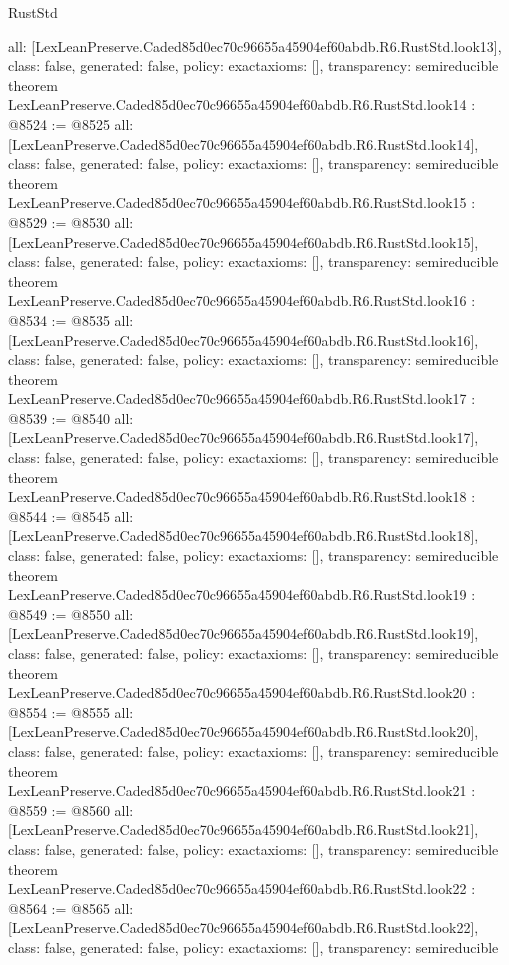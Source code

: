 \begin{lexlean}{RustStd}
\begin{coremodule}
{  all: [LexLeanPreserve.Caded85d0ec70c96655a45904ef60abdb.R6.RustStd.look13],
  class: false,
  generated: false,
  policy: exact{axioms: []},
  transparency: semireducible
}
theorem LexLeanPreserve.Caded85d0ec70c96655a45904ef60abdb.R6.RustStd.look14 : @8524 := @8525 {
  all: [LexLeanPreserve.Caded85d0ec70c96655a45904ef60abdb.R6.RustStd.look14],
  class: false,
  generated: false,
  policy: exact{axioms: []},
  transparency: semireducible
}
theorem LexLeanPreserve.Caded85d0ec70c96655a45904ef60abdb.R6.RustStd.look15 : @8529 := @8530 {
  all: [LexLeanPreserve.Caded85d0ec70c96655a45904ef60abdb.R6.RustStd.look15],
  class: false,
  generated: false,
  policy: exact{axioms: []},
  transparency: semireducible
}
theorem LexLeanPreserve.Caded85d0ec70c96655a45904ef60abdb.R6.RustStd.look16 : @8534 := @8535 {
  all: [LexLeanPreserve.Caded85d0ec70c96655a45904ef60abdb.R6.RustStd.look16],
  class: false,
  generated: false,
  policy: exact{axioms: []},
  transparency: semireducible
}
theorem LexLeanPreserve.Caded85d0ec70c96655a45904ef60abdb.R6.RustStd.look17 : @8539 := @8540 {
  all: [LexLeanPreserve.Caded85d0ec70c96655a45904ef60abdb.R6.RustStd.look17],
  class: false,
  generated: false,
  policy: exact{axioms: []},
  transparency: semireducible
}
theorem LexLeanPreserve.Caded85d0ec70c96655a45904ef60abdb.R6.RustStd.look18 : @8544 := @8545 {
  all: [LexLeanPreserve.Caded85d0ec70c96655a45904ef60abdb.R6.RustStd.look18],
  class: false,
  generated: false,
  policy: exact{axioms: []},
  transparency: semireducible
}
theorem LexLeanPreserve.Caded85d0ec70c96655a45904ef60abdb.R6.RustStd.look19 : @8549 := @8550 {
  all: [LexLeanPreserve.Caded85d0ec70c96655a45904ef60abdb.R6.RustStd.look19],
  class: false,
  generated: false,
  policy: exact{axioms: []},
  transparency: semireducible
}
theorem LexLeanPreserve.Caded85d0ec70c96655a45904ef60abdb.R6.RustStd.look20 : @8554 := @8555 {
  all: [LexLeanPreserve.Caded85d0ec70c96655a45904ef60abdb.R6.RustStd.look20],
  class: false,
  generated: false,
  policy: exact{axioms: []},
  transparency: semireducible
}
theorem LexLeanPreserve.Caded85d0ec70c96655a45904ef60abdb.R6.RustStd.look21 : @8559 := @8560 {
  all: [LexLeanPreserve.Caded85d0ec70c96655a45904ef60abdb.R6.RustStd.look21],
  class: false,
  generated: false,
  policy: exact{axioms: []},
  transparency: semireducible
}
theorem LexLeanPreserve.Caded85d0ec70c96655a45904ef60abdb.R6.RustStd.look22 : @8564 := @8565 {
  all: [LexLeanPreserve.Caded85d0ec70c96655a45904ef60abdb.R6.RustStd.look22],
  class: false,
  generated: false,
  policy: exact{axioms: []},
  transparency: semireducible
}
\end{coremodule}
\end{lexlean}
